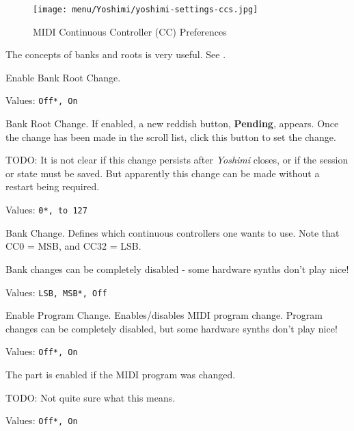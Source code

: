 \begin{figure}[H]
   \centering 
   \texttt{[image: menu/Yoshimi/yoshimi-settings-ccs.jpg]}
   \caption[MIDI CC Preferences]{MIDI Continuous Controller (CC) Preferences}
   \label{fig:yoshimi_settings_cc}
\end{figure}

   \setcounter{ItemCounter}{0}      %

   The concepts of banks and roots is very useful.
   See .

   Enable Bank Root Change.

   Values: \texttt{Off*, On}

   Bank Root Change.
   If enabled, a new reddish button, \textbf{Pending}, appears.
   Once the change has been made in the scroll list, click this button
   to set the change.

   TODO:
   It is not clear if this change persists after \textsl{Yoshimi} closes, or
   if the session or state must be saved.
   But apparently this change can be made without a restart being required.

   Values: \texttt{0*, to 127}

   Bank Change.
   Defines which continuous controllers one wants to use.
   Note that CC0 = MSB, and CC32 = LSB.

   Bank changes can be completely disabled - some hardware
   synths don't play nice!

   Values: \texttt{LSB, MSB*, Off}

   Enable Program Change.
   Enables/disables MIDI program change.
   Program changes can be completely disabled, but some hardware synths don't
   play nice!

   Values: \texttt{Off*, On}

   The part is enabled if the MIDI program was changed.

   TODO:  Not quite sure what this means.

   Values: \texttt{Off*, On}


